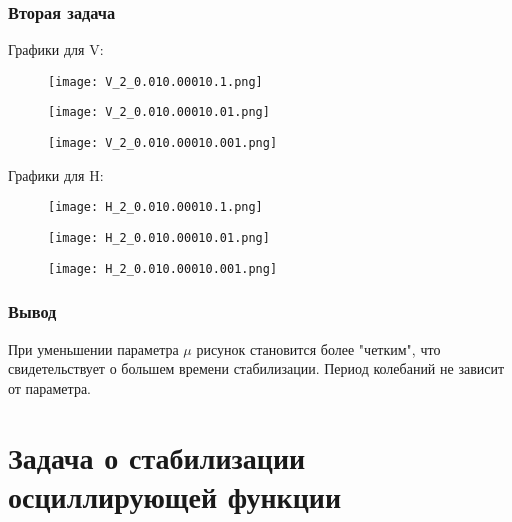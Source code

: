 \documentclass[12pt]{article}
\begin{document}
\subsubsection{Вторая задача}
Графики для V:
\begin{figure}[H]

	\centering
	\begin{minipage}{.5\textwidth}
		\centering
		\texttt{[image: V\_2\_0.010.00010.1.png]}
	\end{minipage}%
	\begin{minipage}{.5\textwidth}
		\centering
		\texttt{[image: V\_2\_0.010.00010.01.png]}
	\end{minipage}
\end{figure}


\begin{figure}[H]
	\centering
	\begin{minipage}{.5\textwidth}
		\centering
		\texttt{[image: V\_2\_0.010.00010.001.png]}
	\end{minipage}%
\end{figure}

Графики для H:
\begin{figure}[H]

	\centering
	\begin{minipage}{.5\textwidth}
		\centering
		\texttt{[image: H\_2\_0.010.00010.1.png]}
	\end{minipage}%
	\begin{minipage}{.5\textwidth}
		\centering
		\texttt{[image: H\_2\_0.010.00010.01.png]}
	\end{minipage}
\end{figure}


\begin{figure}[H]
	\centering
	\begin{minipage}{.5\textwidth}
		\centering
		\texttt{[image: H\_2\_0.010.00010.001.png]}
	\end{minipage}%
\end{figure}

\subsubsection{Вывод}
При уменьшении параметра $\mu$ рисунок становится более "четким",
что свидетельствует о большем времени стабилизации. Период колебаний не зависит от параметра.
\section{Задача о стабилизации осциллирующей функции}
\end{document}
